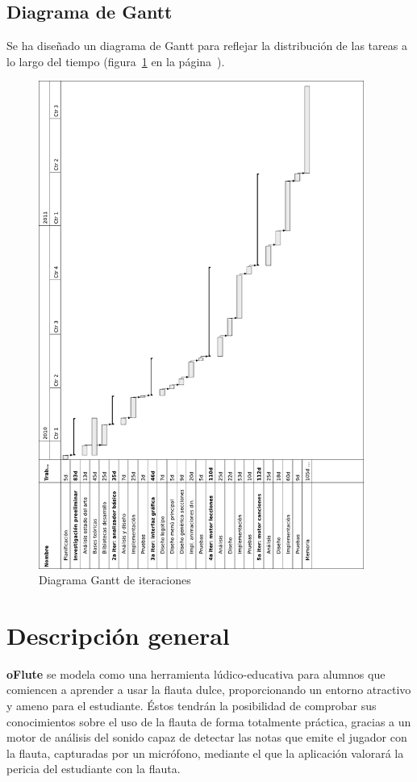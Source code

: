 \documentclass[a4paper,11pt]{article}
\begin{document}
\subsection{Diagrama de Gantt}
Se ha diseñado un diagrama de Gantt para reflejar la distribución de las tareas
a lo largo del tiempo (figura~\ref{fig:gantt} en la página~\pageref{fig:gantt}).

\begin{figure}
  \centering
  \includegraphics[width=0.95\textwidth]{imagen_diagrama_gantt}
  \caption{Diagrama Gantt de iteraciones}
  \label{fig:gantt}
\end{figure}


\section{Descripción general}
\textbf{oFlute} se modela como una herramienta lúdico-educativa para alumnos que
comiencen a aprender a usar la flauta dulce, proporcionando un entorno atractivo
y ameno para el estudiante. Éstos tendrán la posibilidad de comprobar sus
conocimientos sobre el uso de la flauta de forma totalmente práctica, gracias a
un motor de análisis del sonido capaz de detectar las notas que emite el jugador
con la flauta, capturadas por un micrófono, mediante el que la aplicación
valorará la pericia del estudiante con la flauta.
\end{document}
